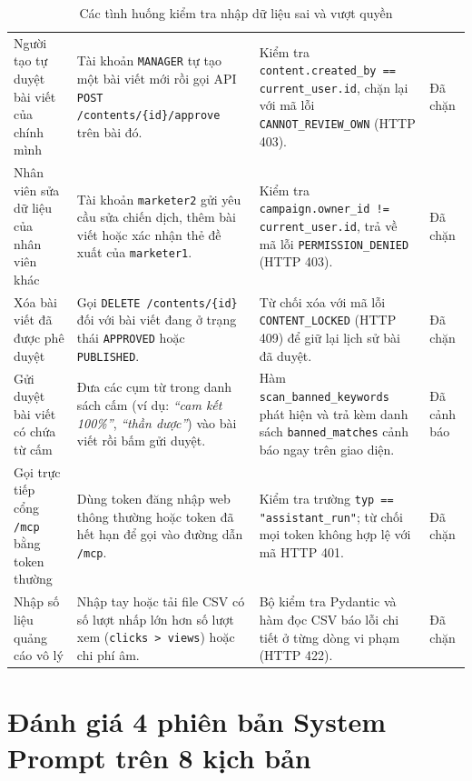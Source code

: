 \begin{table}[!htbp]
\centering
\scriptsize
\renewcommand{\arraystretch}{1.0}
\caption{Các tình huống kiểm tra nhập dữ liệu sai và vượt quyền}\label{tab:adversarial-matrix}
\begin{tabularx}{\textwidth}{|L{3.1cm}|Y|L{3.4cm}|C{1.9cm}|}
\hline
{} &  &  & \\
\hline
Người tạo tự duyệt bài viết của chính mình & Tài khoản \texttt{MANAGER} tự tạo một bài viết mới rồi gọi API \texttt{POST /contents/\{id\}/approve} trên bài đó. & Kiểm tra \texttt{content.created\_by == current\_user.id}, chặn lại với mã lỗi \texttt{CANNOT\_REVIEW\_OWN} (HTTP 403). & Đã chặn\\
\hline
Nhân viên sửa dữ liệu của nhân viên khác & Tài khoản \texttt{marketer2} gửi yêu cầu sửa chiến dịch, thêm bài viết hoặc xác nhận thẻ đề xuất của \texttt{marketer1}. & Kiểm tra \texttt{campaign.owner\_id != current\_user.id}, trả về mã lỗi \texttt{PERMISSION\_DENIED} (HTTP 403). & Đã chặn\\
\hline
Xóa bài viết đã được phê duyệt & Gọi \texttt{DELETE /contents/\{id\}} đối với bài viết đang ở trạng thái \texttt{APPROVED} hoặc \texttt{PUBLISHED}. & Từ chối xóa với mã lỗi \texttt{CONTENT\_LOCKED} (HTTP 409) để giữ lại lịch sử bài đã duyệt. & Đã chặn\\
\hline
Gửi duyệt bài viết có chứa từ cấm & Đưa các cụm từ trong danh sách cấm (ví dụ: \textit{``cam kết 100\%''}, \textit{``thần dược''}) vào bài viết rồi bấm gửi duyệt. & Hàm \texttt{scan\_banned\_keywords} phát hiện và trả kèm danh sách \texttt{banned\_matches} cảnh báo ngay trên giao diện. & Đã cảnh báo\\
\hline
Gọi trực tiếp cổng \texttt{/mcp} bằng token thường & Dùng token đăng nhập web thông thường hoặc token đã hết hạn để gọi vào đường dẫn \texttt{/mcp}. & Kiểm tra trường \texttt{typ == "assistant\_run"}; từ chối mọi token không hợp lệ với mã HTTP 401. & Đã chặn\\
\hline
Nhập số liệu quảng cáo vô lý & Nhập tay hoặc tải file CSV có số lượt nhấp lớn hơn số lượt xem (\texttt{clicks > views}) hoặc chi phí âm. & Bộ kiểm tra Pydantic và hàm đọc CSV báo lỗi chi tiết ở từng dòng vi phạm (HTTP 422). & Đã chặn\\
\hline
\end{tabularx}
\end{table}

\section{Đánh giá 4 phiên bản System Prompt trên 8 kịch bản}


